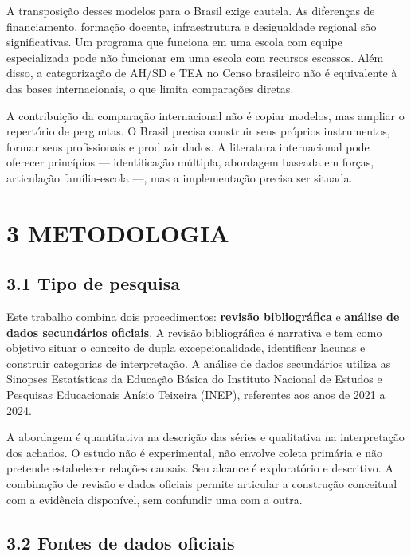 A transposição desses modelos para o Brasil exige cautela. As diferenças
de financiamento, formação docente, infraestrutura e desigualdade
regional são significativas. Um programa que funciona em uma escola com
equipe especializada pode não funcionar em uma escola com recursos
escassos. Além disso, a categorização de AH/SD e TEA no Censo brasileiro
não é equivalente à das bases internacionais, o que limita comparações
diretas.

A contribuição da comparação internacional não é copiar modelos, mas
ampliar o repertório de perguntas. O Brasil precisa construir seus
próprios instrumentos, formar seus profissionais e produzir dados. A
literatura internacional pode oferecer princípios --- identificação
múltipla, abordagem baseada em forças, articulação família-escola ---,
mas a implementação precisa ser situada.

\section{3 METODOLOGIA}\label{metodologia}

\subsection{3.1 Tipo de pesquisa}\label{tipo-de-pesquisa}

Este trabalho combina dois procedimentos: \textbf{revisão bibliográfica}
e \textbf{análise de dados secundários oficiais}. A revisão
bibliográfica é narrativa e tem como objetivo situar o conceito de dupla
excepcionalidade, identificar lacunas e construir categorias de
interpretação. A análise de dados secundários utiliza as Sinopses
Estatísticas da Educação Básica do Instituto Nacional de Estudos e
Pesquisas Educacionais Anísio Teixeira (INEP), referentes aos anos de
2021 a 2024.

A abordagem é quantitativa na descrição das séries e qualitativa na
interpretação dos achados. O estudo não é experimental, não envolve
coleta primária e não pretende estabelecer relações causais. Seu alcance
é exploratório e descritivo. A combinação de revisão e dados oficiais
permite articular a construção conceitual com a evidência disponível,
sem confundir uma com a outra.

\subsection{3.2 Fontes de dados
oficiais}\label{fontes-de-dados-oficiais}

